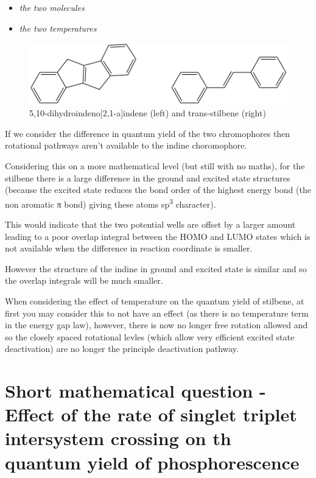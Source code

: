 \documentclass[
]{book}
\providecommand{\tightlist}{%
  \setlength{\itemsep}{0pt}\setlength{\parskip}{0pt}}
\begin{document}
\begin{itemize}
\tightlist
\item
  \emph{the two molecules}
\item
  \emph{the two temperatures}
\end{itemize}

\begin{figure}

{\centering \includegraphics[width=0.6\linewidth]{Images/stilbeneindene} 

}

\caption{5,10-dihydroindeno[2,1-a]indene (left) and trans-stilbene (right)}\label{fig:stilbeneindene}
\end{figure}

If we consider the difference in quantum yield of the two chromophores then rotational pathways aren't available to the indine choromophore.

Considering this on a more mathematical level (but still with no maths), for the stilbene there is a large difference in the ground and excited state structures (because the excited state reduces the bond order of the highest energy bond (the non aromatic π bond) giving these atoms sp\textsuperscript{3} character).

This would indicate that the two potential wells are offset by a larger amount leading to a poor overlap integral between the HOMO and LUMO states which is not available when the difference in reaction coordinate is smaller.

However the structure of the indine in ground and excited state is similar and so the overlap integrals will be much smaller.

When considering the effect of temperature on the quantum yield of stilbene, at first you may consider this to not have an effect (as there is no temperature term in the energy gap law), however, there is now no longer free rotation allowed and so the closely spaced rotational levles (which allow very efficient excited state deactivation) are no longer the principle deactivation pathway.

\hypertarget{sec:ratephos}{%
\section{Short mathematical question - Effect of the rate of singlet triplet intersystem crossing on th quantum yield of phosphorescence}\label{sec:ratephos}}
\end{document}
